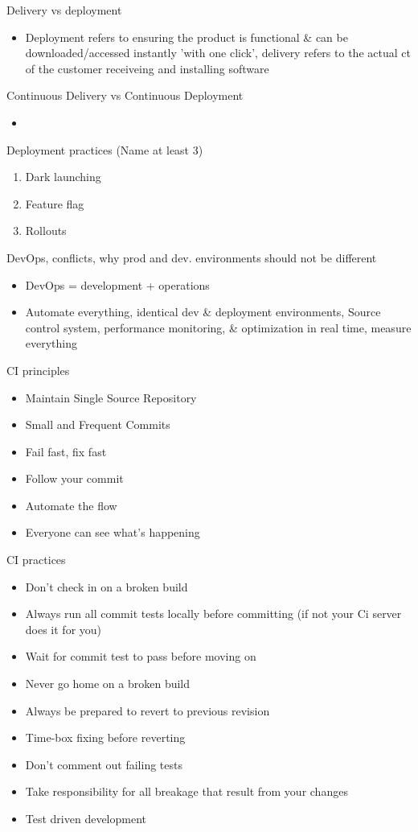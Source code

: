 \documentclass[10pt]{article}
\begin{document}
Delivery vs deployment
\begin{itemize}
\item Deployment refers to ensuring the product is functional \& can be downloaded/accessed instantly 'with one click', delivery refers to the actual ct of the customer receiveing and installing software
\end{itemize}
Continuous Delivery vs Continuous Deployment
\begin{itemize}
\item 
\end{itemize}
Deployment practices (Name at least 3)
\begin{enumerate}
\item Dark launching
\item Feature flag
\item Rollouts
\end{enumerate}
DevOps, conflicts, why prod and dev. environments should not be different
\begin{itemize}
\item DevOps = development + operations
\item Automate everything, identical dev \& deployment environments, Source control system, performance monitoring, \& optimization in real time, measure everything
\end{itemize}
CI principles
\begin{itemize}
\item Maintain Single Source Repository
\item Small and Frequent Commits
\item Fail fast, fix fast
\item Follow your commit
\item Automate the flow
\item Everyone can see what's happening
\end{itemize}
CI practices
\begin{itemize}
\item Don’t check in on a broken build
\item  Always run all commit tests locally before committing (if not your Ci
server does it for you)
\item Wait for commit test to pass before moving on
\item Never go home on a broken build
\item Always be prepared to revert to previous revision
\item Time-box fixing before reverting
\item Don’t comment out failing tests
\item Take responsibility for all breakage that result from your changes
\item Test driven development 
\end{itemize}
\end{document}
